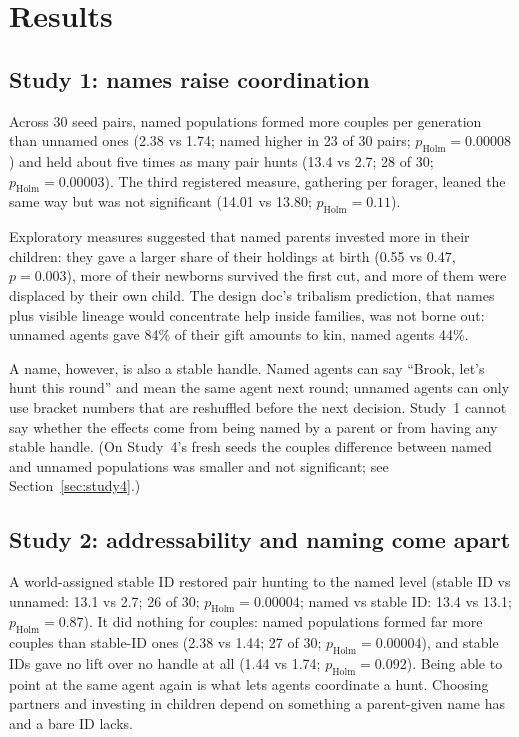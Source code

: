 \documentclass[11pt]{article}
\newcommand{\pholm}{p_{\mathrm{Holm}}}
\begin{document}
\section{Results}
\label{sec:results}

\subsection{Study 1: names raise coordination}

Across 30 seed pairs, named populations formed more couples per generation than unnamed ones
(2.38 vs 1.74; named higher in 23 of 30 pairs; $\pholm=0.00008$) and held about five times as
many pair hunts (13.4 vs 2.7; 28 of 30; $\pholm=0.00003$). The third registered measure,
gathering per forager, leaned the same way but was not significant (14.01 vs 13.80; $\pholm=0.11$).

Exploratory measures suggested that named parents invested more in their children: they gave a
larger share of their holdings at birth (0.55 vs 0.47, $p=0.003$), more of their newborns
survived the first cut, and more of them were displaced by their own child. The design doc's
tribalism prediction, that names plus visible lineage would concentrate help inside families,
was not borne out: unnamed agents gave 84\% of their gift amounts to kin, named agents 44\%.

A name, however, is also a stable handle. Named agents can say ``Brook, let's hunt this round''
and mean the same agent next round; unnamed agents can only use bracket numbers that are
reshuffled before the next decision. Study~1 cannot say whether the effects come from being named
by a parent or from having any stable handle. (On Study~4's fresh seeds the couples difference
between named and unnamed populations was smaller and not significant; see
Section~\ref{sec:study4}.)

\subsection{Study 2: addressability and naming come apart}

A world-assigned stable ID restored pair hunting to the named level (stable ID vs unnamed: 13.1
vs 2.7; 26 of 30; $\pholm=0.00004$; named vs stable ID: 13.4 vs 13.1; $\pholm=0.87$). It did
nothing for couples: named populations formed far more couples than stable-ID ones (2.38 vs 1.44;
27 of 30; $\pholm=0.00004$), and stable IDs gave no lift over no handle at all (1.44 vs 1.74;
$\pholm=0.092$). Being able to point at the same agent again is what lets agents coordinate a
hunt. Choosing partners and investing in children depend on something a parent-given name has and
a bare ID lacks.
\end{document}
